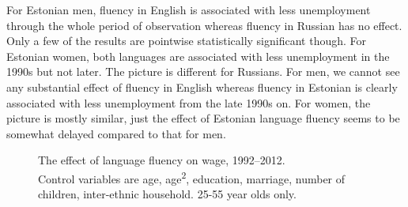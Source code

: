\documentclass[12pt, a4paper]{article}
\newcommand{\modelTwo}{age, age\textsuperscript{2}, education, marriage, number of children, inter-ethnic household}
\newcommand{\agerestrictions}{25-55 year olds only.}
\begin{document}
For Estonian men, fluency in English is associated with less unemployment through the whole
period of observation whereas fluency in Russian has no effect.
Only a few of the results are pointwise statistically significant though.
For Estonian women, both languages are associated with less
unemployment in the 1990s but not later. The picture is different for
Russians. For men, we cannot see any substantial effect of fluency in English
whereas fluency in Estonian is clearly associated with less unemployment from
the late 1990s on. For women, the picture is mostly similar, just the
effect of Estonian language fluency seems to be somewhat delayed compared to
that for men.

\begin{figure}[htb]
	\centering
	\caption{The effect of language fluency on wage, 1992--2012. \\ Control variables are \modelTwo. \agerestrictions}
	\label{fig:long-run_wage}
\end{figure}
\end{document}
